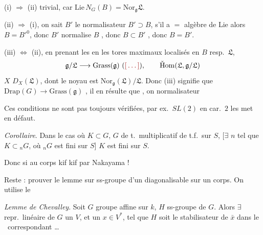 \documentclass[11pt,a4paper]{article}
\begin{document}
(i) $\Rightarrow$ (ii) trivial, car 
$\mathrm{Lie}\, N_G(B) = \mathrm{Nor}_{\mathfrak{g}} \mathfrak{L}$.

(ii) $\Rightarrow$ (i), on sait $B'$ le normalisateur $B' \supset B$,
s'il a $=$ algèbre de Lie alors $B = B'^0$, donc $B'$
normalise $B$ , donc $B \subset B'$ ,
donc $B = B'$.

(iii) $\iff$ (ii),  en prenant les 
en les
tores maximaux localisés en $B$ resp.\ $\mathfrak{L}$,
\[
\mathfrak{g}/\mathfrak{L} \longrightarrow \mathrm{Grass}(\mathfrak{g})
\ (\ill{}) , \qquad \check{\mathrm{H}}\mathrm{om}(\mathfrak{L}, \mathfrak{g}/\mathfrak{L})
\]
\ill{} $X$ \ill{} $D_X(\mathfrak{L})$, \struck{\ill{} \ill{}} dont le
noyau est $\mathrm{Nor}_{\mathfrak{g}}(\mathfrak{L})/\mathfrak{L}$.
Donc (iii) signifie que $\mathrm{Drap}(G) \to \mathrm{Grass}(\mathfrak{g})$
\ill{} ,  il en résulte
que \ill{} \ill{}, on \ill{} normalisateur \ill{}

Ces conditions ne sont pas toujours vérifiées, par ex.\
$SL(2)$ en car.\ $2$ les met en défaut.



\emph{Corollaire}. Dans le cas où $K \subset G$, $G$ de t.\ multiplicatif
de t.f.\ sur $S$, [$\exists$ $n$ tel que $K \subset {}_nG$, où ${}_nG$ est
fini sur $S$] $K$ est fini sur $S$.

Donc si \ill{} \ill{} \ill{} \ill{}  au corps
 kif kif   par
Nakayama !


Reste : prouver le lemme sur  ss-groupe d'un diagonalisable
sur un corps. On utilise le

\emph{Lemme de Chevalley}. Soit $G$ groupe 
affine sur $k$, $H$ ss-groupe de $G$. Alors $\exists$ repr.\
linéaire de $G$  un $V$, et un $x \in V^{*}$, tel que
$H$ soit le stabilisateur de $\bar x$ dans le \
correspondant \ldots
\end{document}
